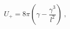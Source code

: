 \begin{equation}
U_+= 8\pi \left( \gamma - \frac{\gamma^3}{l^2} \right) \ ,
\label{up}
\end{equation}

